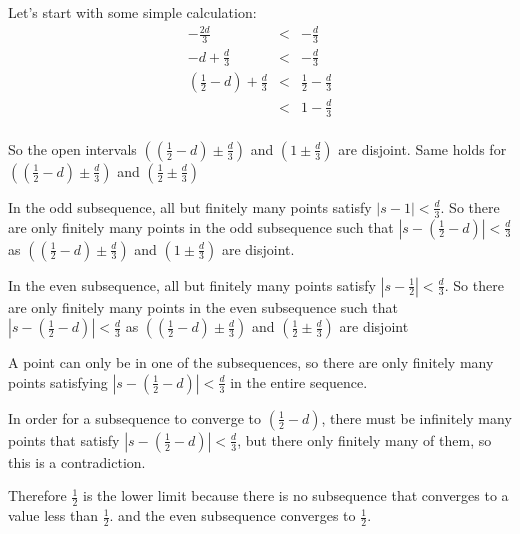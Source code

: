 Let's start with some simple calculation:
\begin{eqnarray*}
                      -\frac{2d}{3} &<& -\frac{d}{3} \\
                   -d + \frac{d}{3} &<& -\frac{d}{3} \\
      \left(\frac{1}{2} - d\right) + \frac{d}{3} &<& \frac{1}{2} - \frac{d}{3} \\
                                    &<& 1 - \frac{d}{3} \\
\end{eqnarray*}

So the open intervals $ \left(\left(\frac{1}{2} - d\right) \pm \frac{d}{3}\right) $ and $ \left(1 \pm \frac{d}{3}\right) $ are disjoint. Same holds for $ \left(\left(\frac{1}{2} - d\right) \pm \frac{d}{3}\right) $ and $ \left(\frac{1}{2} \pm \frac{d}{3}\right) $

In the odd subsequence, all but finitely many points satisfy $ | s - 1 | < \frac{d}{3} $. So there are only finitely many points in the odd subsequence
such that $ | s - \left(\frac{1}{2} - d\right) | < \frac{d}{3} $ as $ \left(\left(\frac{1}{2} - d\right) \pm \frac{d}{3}\right) $ and $ \left(1 \pm \frac{d}{3}\right) $ are disjoint.

In the even subsequence, all but finitely many points satisfy $ | s - \frac{1}{2} | < \frac{d}{3} $. So there are only finitely many points in the even subsequence
such that $ | s - \left(\frac{1}{2} - d\right) | < \frac{d}{3} $ as $ \left(\left(\frac{1}{2} - d\right) \pm \frac{d}{3}\right) $ and $ \left(\frac{1}{2} \pm \frac{d}{3}\right) $ are disjoint

A point can only be in one of the subsequences, so there are only finitely many points satisfying $ | s - \left(\frac{1}{2} - d\right) | < \frac{d}{3} $ in the entire sequence.

In order for a subsequence to converge to $ \left(\frac{1}{2} - d\right) $, there must be infinitely many points that satisfy $ | s - \left(\frac{1}{2} - d\right) | < \frac{d}{3} $, but there only finitely many of them, so this is a contradiction.

Therefore $\frac{1}{2}$ is the lower limit because there is no subsequence that converges to a value less than $\frac{1}{2}$. and the even subsequence converges to $\frac{1}{2}$.